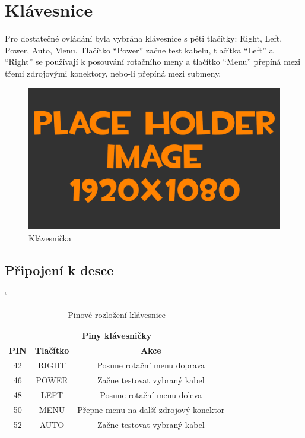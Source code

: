 
\section{Klávesnice}
Pro dostatečné ovládání byla vybrána klávesnice s pěti tlačítky: Right, Left, Power, Auto, Menu. Tlačítko “Power” začne test kabelu, tlačítka “Left” a “Right” se používají k posouvání rotačního meny a tlačítko “Menu” přepíná mezi třemi zdrojovými konektory, nebo-li přepíná mezi submeny.

\begin{figure}[h!]
	\centering
	\includegraphics[width=\textwidth]{pictures/placeHolderFHD.png}
    	\caption{Klávesnička}
   	\label{fig:keyborad}
\end{figure}

\subsection*{Připojení k desce}
\begin{table} [h!]
	\caption{Pinové rozložení klávesnice}
	\label{table:pinKB}
	\centering
	\catcode` %
	\begin{tabular}[c]{|| c | c | c ||}
	\hline
		\multicolumn{3}{||c||}{Piny klávesničky} \\
	\hline
 		 \textbf{PIN} & \textbf{Tlačítko} & \textbf{Akce}\\
	\hline
		42 &  RIGHT & Posune rotační menu doprava\\
	\hline
		46 & POWER &  Začne testovat vybraný kabel\\
	\hline
		48 & LEFT & Posune rotační menu doleva\\
	\hline
		50 & MENU & Přepne menu na další zdrojový konektor \\
	\hline
		52 & AUTO & Začne testovat vybraný kabel\\
	\hline
	\end{tabular}
\end{table}
